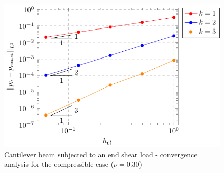 \documentclass{wccm2024}
\begin{document}
\begin{figure} [!htb]
    \includegraphics[trim={8.5cm 0cm 0cm 0cm},clip,scale=0.75]{figs/bishop-pres-03.pdf}
    \caption{Cantilever beam subjected to an end shear load - convergence analysis for the compressible case ($\nu=0.30$)}
    \label{fig:bishop-convergence-nu-03}
\end{figure}
\end{document}
